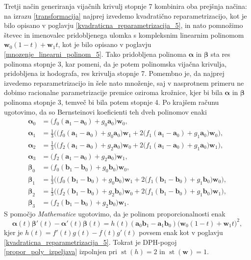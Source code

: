 \documentclass[12pt,a4paper,twoside]{article}
\theoremstyle{definition} %
\theoremstyle{plain} %
\theoremstyle{primerstyle}
\numberwithin{equation}{section}  %
\newcommand{\aV}{\mathbf{a}}
\newcommand{\bV}{\mathbf{b}}
\newcommand{\wV}{\mathbf{w}}
\newcommand{\balpha}{\boldsymbol \alpha}
\newcommand{\bbeta}{\boldsymbol \beta}
\DeclareMathOperator{\st}{st}
\begin{document}
Tretji način generiranja vijačnih krivulj stopnje 7 kombinira oba prejšnja načina: na izrazu \eqref{transformacija} najprej izvedemo kvadratično reparametrizacijo, kot je bilo opisano v poglavju \ref{kvadraticna_reparametrizacija_5}, in nato pomnožimo števec in imenovalec pridobljenega ulomka s kompleksnim linearnim polinomom $\wV_0(1-t)+\wV_1t$, kot je bilo opisano v poglavju \ref{mnozenje_linearni_polinom_5}. Tako pridobljena polinoma $\balpha$ in $\bbeta$ sta res polinoma stopnje 3, kar pomeni, da je potem polinomska vijačna krivulja, pridobljena iz hodografa, res krivulja stopnje 7. Pomembno je, da najprej izvedemo reparametrizacijo in šele nato množenje, saj v nasprotnem primeru ne dobimo racionalne parametrizacije premice oziroma krožnice, kjer bi bila $\balpha$ in $\bbeta$ polinoma stopnje 3, temveč bi bila potem stopnje 4. Po krajšem računu ugotovimo, da so Bernsteinovi koeficienti teh dveh polinomov enaki
\begin{align}
	\balpha_0&=\big(f_0(\aV_1-\aV_0)+g_0\aV_0\big)\wV_0,\nonumber\\
	\balpha_1&=\frac{1}{3}\Big(\big(f_0(\aV_1-\aV_0)+g_0\aV_0\big)\wV_1+2\big(f_1(\aV_1-\aV_0)+g_1\aV_0\big)\wV_0\Big),\nonumber\\
	\balpha_2&=\frac{1}{3}\Big(\big(f_2(\aV_1-\aV_0)+g_2\aV_0\big)\wV_0+2\big(f_1(\aV_1-\aV_0)+g_1\aV_0\big)\wV_1\Big),\nonumber\\
	\balpha_3&=\big(f_2(\aV_1-\aV_0)+g_2\aV_0\big)\wV_1,\label{mnozenje_repara_7_koef}\\
	\bbeta_0&=\big(f_0(\bV_1-\bV_0)+g_0\bV_0\big)\wV_0,\nonumber\\
	\bbeta_1&=\frac{1}{3}\Big(\big(f_0(\bV_1-\bV_0)+g_0\bV_0\big)\wV_1+2\big(f_1(\bV_1-\bV_0)+g_1\bV_0\big)\wV_0\Big),\nonumber\\
	\bbeta_2&=\frac{1}{3}\Big(\big(f_2(\bV_1-\bV_0)+g_2\bV_0\big)\wV_0+2\big(f_1(\bV_1-\bV_0)+g_1\bV_0\big)\wV_1\Big),\nonumber\\
	\bbeta_3&=\big(f_2(\bV_1-\bV_0)+g_2\bV_0\big)\wV_1.\nonumber
\end{align}
S pomočjo \emph{Mathematice} ugotovimo, da je polinom proporcionalnosti enak
\begin{equation*}
	\balpha(t)\bbeta'(t)-\balpha'(t)\bbeta(t)=h(t)(\aV_0\bV_1-\aV_1\bV_0)\big(\wV_0(1-t)+\wV_1t\big)^2,
\end{equation*}
kjer je $h(t)=f'(t)g(t)-f(t)g'(t)$ povsem enak kot v poglavju \ref{kvadraticna_reparametrizacija_5}. Tokrat je DPH-pogoj \eqref{propor_poly_izpeljava} izpolnjen pri $\st(h)=2$ in $\st(\wV)=1.$
\end{document}
